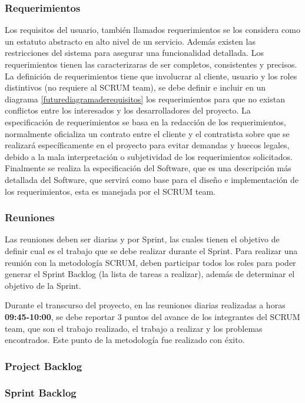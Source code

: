 \subsubsection{Requerimientos}

Los requisitos del usuario, también llamados requerimientos se los considera como un estatuto abstracto en alto nivel de un servicio. Además existen las restricciones del sistema para asegurar una funcionalidad detallada. Los requerimientos tienen las caracterizaras de ser completos, consistentes y precisos. 
La definición de requerimientos tiene que involucrar al cliente, usuario y los roles distintivos (no requiere al SCRUM team), se debe definir e incluir en un diagrama \ref{futurediagramaderequisitos} los requerimientos para que no existan conflictos entre los interesados y los desarrolladores del proyecto.
La especificación de requerimientos se basa en la redacción de los requerimientos, normalmente oficializa un contrato entre el cliente y el contratista sobre que se realizará específicamente en el proyecto para evitar demandas y huecos legales, debido a la mala interpretación o subjetividad de los requerimientos solicitados.
Finalmente se realiza la especificación del Software, que es una descripción más detallada del Software, que servirá como base para el diseño e implementación de los requerimientos, esta es manejada por el SCRUM team.

\subsubsection{Reuniones}

Las reuniones deben ser diarias y por Sprint, las cuales tienen el objetivo de definir cual es el trabajo que se debe realizar durante el Sprint. Para realizar una reunión con la metodología SCRUM, deben participar todos los roles para poder generar el Sprint Backlog (la lista de tareas a realizar), además de determinar el objetivo de la Sprint.

Durante el transcurso del proyecto, en las reuniones diarias realizadas a horas \textbf{09:45-10:00}, se debe reportar 3 puntos del avance de los integrantes del SCRUM team, que son el trabajo realizado, el trabajo a realizar y los problemas encontrados. Este punto de la metodología fue realizado con éxito.


\subsubsection{Project Backlog}
\subsubsection{Sprint Backlog}

